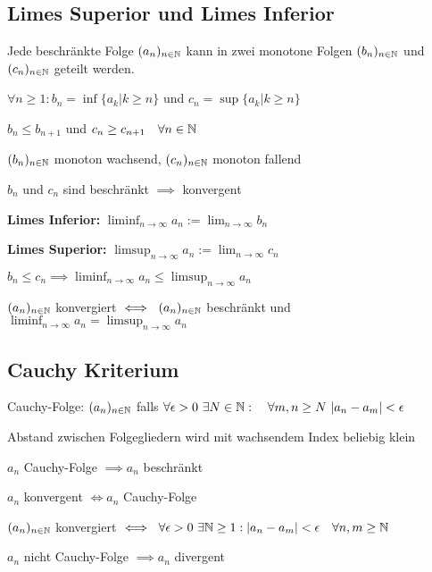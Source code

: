 \subsection{Limes Superior und Limes Inferior}
Jede beschränkte Folge $(a_n)_{n \in \mathbb{N}}$ kann in zwei monotone Folgen $(b_n)_{n \in \mathbb{N}}$ und $(c_n)_{n \in \mathbb{N}}$ geteilt werden.
\begin{compactenum}
    \item $\forall n \ge 1: b_n = \inf \{a_k | k \ge n\}$ und $c_n = \sup \{a_k | k \ge n\} $
    \item $b_n \le b_{n+1}$ und $c_n \ge c_{n+1} \quad \forall n \in \mathbb{N}$
    \item $(b_n)_{n \in \mathbb{N}}$ monoton wachsend, $(c_n)_{n \in \mathbb{N}}$ monoton fallend
    \item $b_n$ und $c_n$ sind beschränkt $\implies$ konvergent
    \item \textbf{Limes Inferior:} $\liminf_{n \to \infty} a_n := \lim_{n \to \infty} b_n $
    \item \textbf{Limes Superior:} $\limsup_{n \to \infty} a_n := \lim_{n \to \infty} c_n $
    \item $b_n \le  c_n \implies \liminf_{n \to \infty} a_n \le  \limsup_{n \to \infty} a_n $
\end{compactenum}

\begin{compactitem}
    \item $(a_n)_{n \in \mathbb{N}}$ konvergiert $\iff \ (a_n)_{n \in \mathbb{N}}$ beschränkt und $\liminf_{n \to \infty} a_n = \limsup_{n \to \infty} a_n$
\end{compactitem}

\subsection{Cauchy Kriterium}
\begin{compactdesc}
    \item[Cauchy-Folge:] $(a_n)_{n \in \mathbb{N}}$ falls $\forall \epsilon > 0 \ \exists N \in \N: \quad \forall m,n \ge N \ |a_n - a_m| < \epsilon$
        \begin{compactitem}
            \item Abstand zwischen Folgegliedern wird mit wachsendem Index beliebig klein
        \end{compactitem}
\end{compactdesc}

\begin{compactitem}
    \item $a_n$ Cauchy-Folge $\implies a_n$ beschränkt
    \item $a_n$ konvergent $\iff a_n$ Cauchy-Folge
    \item $(a_n)_{n \in \mathbb{N}}$ konvergiert $\iff \ \forall \epsilon > 0 \ \exists \mathbb{N} \ge 1: |a_n - a_m| < \epsilon \quad \forall n,m \ge \mathbb{N}$
    \item $a_n$ nicht Cauchy-Folge $\implies a_n$ divergent
\end{compactitem}

